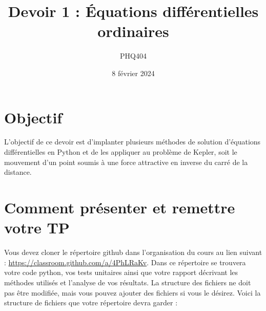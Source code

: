 \documentclass[12pt, letterpaper]{article}
\begin{document}
\title{Devoir 1 : Équations différentielles ordinaires}
\author{PHQ404}
\date{8 février 2024}
\maketitle

\section{Objectif}\label{sec:objectif}

\noindent L'objectif de ce devoir est d'implanter plusieurs méthodes de solution
d'équations différentielles en Python 
et de les appliquer au problème de Kepler,
soit le mouvement d'un point soumis à une force attractive 
en inverse du carré de la distance.


\section{Comment présenter et remettre votre TP}\label{sec:comment-presenter-et-remettre-votre-tp}

\noindent Vous devez cloner le répertoire github dans l'organisation du cours au lien suivant :
\href{https://classroom.github.com/a/4PhLRaKv}{https://classroom.github.com/a/4PhLRaKv}.
Dans ce répertoire se trouvera votre code python, vos tests unitaires ainsi que votre rapport
décrivant les méthodes utilisés et l'analyse de vos résultats.
La structure des fichiers ne doit pas être modifiée, mais vous pouvez ajouter des fichiers si vous le désirez.
Voici la structure de fichiers que votre répertoire devra garder :

\bigskip
\end{document}
